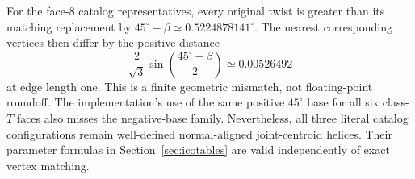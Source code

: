 \documentclass[11pt]{article}
\theoremstyle{definition}
\newcommand{\degc}{^{\circ}}
\begin{document}
For the face-$8$ catalog representatives, every original twist is greater
than its matching replacement by
$45\degc-\beta\simeq0.5224878141\degc$. The nearest corresponding vertices
then differ by the positive distance
\begin{equation}\label{eq:mismatch}
 \frac{2}{\sqrt3}\sin\!\left(\frac{45\degc-\beta}{2}\right)
 \simeq0.00526492
\end{equation}
at edge length one. This is a finite geometric mismatch, not floating-point
roundoff. The implementation's use of the same positive $45\degc$ base
for all six class-$T$ faces also misses the negative-base family.
Nevertheless, all three literal catalog configurations remain well-defined
normal-aligned joint-centroid helices. Their parameter formulas in
Section~\ref{sec:icotables} are valid independently of exact vertex matching.
\end{document}
